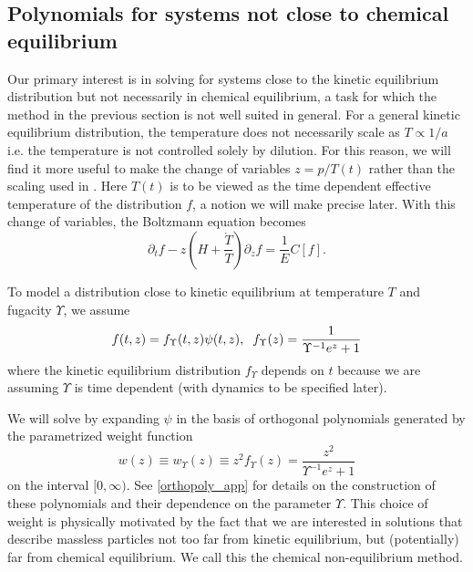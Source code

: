 \subsection{Polynomials for systems   not close to chemical equilibrium}\label{kinetic_eq_approach}
Our primary interest is in solving  for systems close to the kinetic equilibrium distribution  but not necessarily in chemical equilibrium, a task for which the method in the previous section is not well suited in general. For a general kinetic equilibrium distribution, the temperature does not necessarily scale as $T\propto 1/a$ i.e. the temperature is not controlled solely by dilution.  For this reason, we will find it more useful to make the change of variables $z=p/T(t)$ rather than the scaling used in .  Here $T(t)$ is to be viewed as the time dependent effective temperature of the distribution $f$, a notion we will make precise later.  With this change of variables, the Boltzmann equation becomes
\begin{equation}\label{T_boltzmann}
\partial_t f-z\left(H+\frac{\dot T}{T}\right)\partial_z f=\frac{1}{E}C[f].
\end{equation}


 To model a distribution close to kinetic equilibrium at temperature $T$ and fugacity $\Upsilon$, we assume
\begin{equation}\label{kinetic_approx}
f(t,z)= f_\Upsilon (t,z)\psi(t,z),\hspace{2mm} f_\Upsilon(z)=\frac{1}{\Upsilon^{-1}e^z+1}
\end{equation}
where the kinetic equilibrium distribution $f_\Upsilon $ depends on $t$ because we are assuming $\Upsilon$ is time dependent (with dynamics to be specified later). 

We will solve  by expanding $\psi$ in the basis of orthogonal polynomials generated by the parametrized weight function
\begin{equation}\label{weight}
w(z)\equiv w_\Upsilon(z)\equiv z^2f_\Upsilon (z)=\frac{z^2}{\Upsilon^{-1} e^z+1}
\end{equation}
on the interval $[0,\infty)$. See \ref{orthopoly_app} for details on the construction of these polynomials and their dependence on the parameter $\Upsilon$. This choice of weight is physically motivated by the fact that we are interested in solutions that describe massless particles not too far from kinetic equilibrium, but (potentially) far from chemical equilibrium. We call this the chemical non-equilibrium method.

